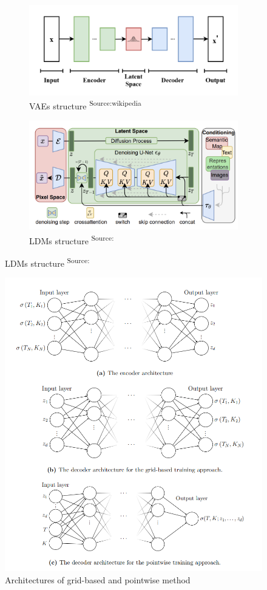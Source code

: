 \documentclass{article}
\begin{document}
\newpage

\begin{figure}[htp]
    \centering
    \begin{subfigure}{0.45\textwidth}
    \centering
        \includegraphics[width=\textwidth]{img/vaewiki.png}
        \caption{VAEs structure \textsuperscript{Source:wikipedia}}
        \label{fig:a}
    \end{subfigure}
    \hfill
        \begin{subfigure}{0.45\textwidth}
    \centering
        \includegraphics[width=\textwidth]{img/ldm.png}
        \caption{LDMs structure \textsuperscript{Source:\cite{rombach2022highresolutionimagesynthesislatent}}}
        \label{fig:c}
    \end{subfigure}

\end{figure}


\begin{figure}[htp]
    \centering
    \includegraphics[width=0.6\linewidth]{img/vae_vol.png}
    \caption{Architectures of grid-based and pointwise method}
    \label{fig:b}
\end{figure}
\end{document}
